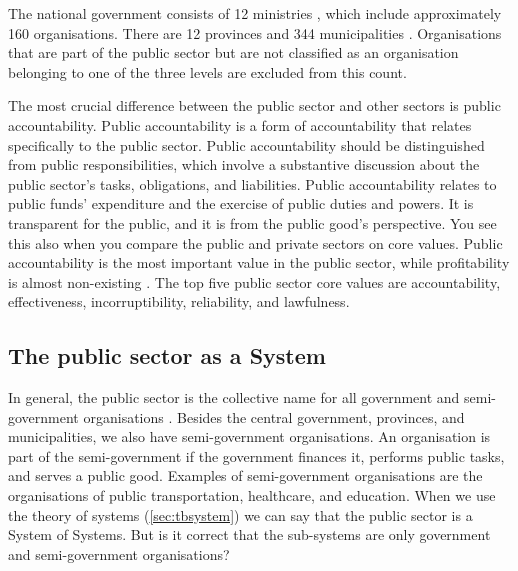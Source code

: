 The national government consists of 12 ministries \parencite{Rijksoverheid}, which include approximately 160 organisations. There are 12 provinces \parencite{Overheidsvormen} and 344 municipalities \parencite{Herindeling}. Organisations that are part of the public sector but are not classified as an organisation belonging to one of the three levels are excluded from this count. 

The most crucial difference between the public sector and other sectors is public accountability. Public accountability is a form of accountability that relates specifically to the public sector. Public accountability should be distinguished from public responsibilities, which involve a substantive discussion about the public sector's tasks, obligations, and liabilities. Public accountability relates to public funds' expenditure and the exercise of public duties and powers. It is transparent for the public, and it is from the public good's perspective. You see this also when you compare the public and private sectors on core values. Public accountability is the most important value in the public sector, while profitability is almost non-existing \parencite[p.~472]{Wal2008}. The top five public sector core values are accountability, effectiveness, incorruptibility, reliability, and lawfulness.

\subsection{The public sector as a System}
\label{sub:tbpssystemofsystems}
In general, the public sector is the collective name for all government and semi-government organisations \parencite{Privacysense2016}. Besides the central government, provinces, and municipalities, we also have semi-government organisations. An organisation is part of the semi-government if the government finances it, performs public tasks, and serves a public good. Examples of semi-government organisations are the organisations of public transportation, healthcare, and education. When we use the theory of systems (\cref{sec:tbsystem}) we can say that the public sector is a System of Systems. But is it correct that the sub-systems are only government and semi-government organisations?

